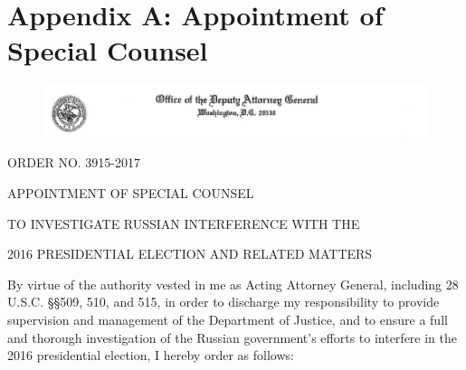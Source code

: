 \section{Appendix A: Appointment of Special Counsel}

\newpage

\begin{figure}[ht]
    \vspace{-20pt}
    \begin{center}
        \includegraphics[width=8.25in]{images/appendix-a-header.png}%
    \end{center}
    \vspace{-20pt}
\end{figure}

\begin{center}
ORDER NO. 3915-2017

APPOINTMENT OF SPECIAL COUNSEL

TO INVESTIGATE RUSSIAN INTERFERENCE WITH THE

2016 PRESIDENTIAL ELECTION AND RELATED MATTERS
\end{center}

By virtue of the authority vested in me as Acting Attorney General, including 28 U.S.C. \S\S 509, 510, and 515, in order to discharge my responsibility to provide supervision and management of the Department of Justice, and to ensure a full and thorough investigation of the Russian government's efforts to interfere in the 2016 presidential election, I hereby order as follows:

